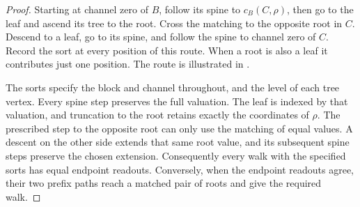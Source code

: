 \documentclass[11pt]{article}
\theoremstyle{definition}
\begin{document}
\begin{proof}
Starting at channel zero of \(B\), follow its spine to
\(c_B(C,\rho)\), then go to the leaf and ascend its tree to the root.
Cross the matching to the opposite root in \(C\).
Descend to a leaf, go to its spine, and follow the spine to channel
zero of \(C\).
Record the sort at every position of this route.
When a root is also a leaf it contributes just one position.
The route is illustrated in .

The sorts specify the block and channel throughout, and the level
of each tree vertex.  Every spine step preserves the full valuation.
The leaf is indexed by that valuation, and truncation to the root
retains exactly the coordinates of \(\rho\).
The prescribed step to the opposite root can only use the matching
of equal values.  A descent on the other side extends that same root
value, and its subsequent spine steps preserve the chosen extension.
Consequently every walk with the specified sorts has equal endpoint
readouts.  Conversely, when the endpoint readouts agree, their two
prefix paths reach a matched pair of roots and give the required walk.
\end{proof}
\end{document}
